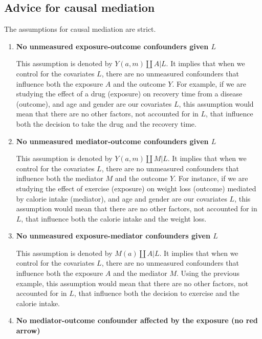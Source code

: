 \documentclass[
  singlecolumn]{report}
\begin{document}
\hypertarget{advice-for-causal-mediation}{%
\subsection{Advice for causal
mediation}\label{advice-for-causal-mediation}}

The assumptions for causal mediation are strict.

\begin{enumerate}
\def\labelenumi{\arabic{enumi}.}
\item
  \textbf{No unmeasured exposure-outcome confounders given \(L\)}

  This assumption is denoted by \(Y(a,m) \coprod A | L\). It implies
  that when we control for the covariates \(L\), there are no unmeasured
  confounders that influence both the exposure \(A\) and the outcome
  \(Y\). For example, if we are studying the effect of a drug (exposure)
  on recovery time from a disease (outcome), and age and gender are our
  covariates \(L\), this assumption would mean that there are no other
  factors, not accounted for in \(L\), that influence both the decision
  to take the drug and the recovery time.
\item
  \textbf{No unmeasured mediator-outcome confounders given \(L\)}

  This assumption is denoted by \(Y(a,m) \coprod M | L\). It implies
  that when we control for the covariates \(L\), there are no unmeasured
  confounders that influence both the mediator \(M\) and the outcome
  \(Y\). For instance, if we are studying the effect of exercise
  (exposure) on weight loss (outcome) mediated by calorie intake
  (mediator), and age and gender are our covariates \(L\), this
  assumption would mean that there are no other factors, not accounted
  for in \(L\), that influence both the calorie intake and the weight
  loss.
\item
  \textbf{No unmeasured exposure-mediator confounders given \(L\)}

  This assumption is denoted by \(M(a) \coprod A | L\). It implies that
  when we control for the covariates \(L\), there are no unmeasured
  confounders that influence both the exposure \(A\) and the mediator
  \(M\). Using the previous example, this assumption would mean that
  there are no other factors, not accounted for in \(L\), that influence
  both the decision to exercise and the calorie intake.
\item
  \textbf{No mediator-outcome confounder affected by the exposure (no
  red arrow)}
\end{enumerate}
\end{document}
